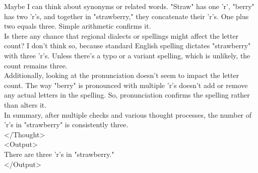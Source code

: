 \begin{abox}

Maybe I can think about synonyms or related words. "Straw" has one 'r', "berry" has two 'r's, and together in "strawberry," they concatenate their 'r's. One plus two equals three. Simple arithmetic confirms it.\\

Is there any chance that regional dialects or spellings might affect the letter count? I don't think so, because standard English spelling dictates "strawberry" with three 'r's. Unless there's a typo or a variant spelling, which is unlikely, the count remains three.\\

Additionally, looking at the pronunciation doesn't seem to impact the letter count. The way "berry" is pronounced with multiple 'r's doesn't add or remove any actual letters in the spelling. So, pronunciation confirms the spelling rather than alters it.\\

In summary, after multiple checks and various thought processes, the number of 'r's in "strawberry" is consistently three.\\
</Thought>\\
<Output>\\
There are three 'r's in "strawberry."\\
</Output>
\end{abox}

